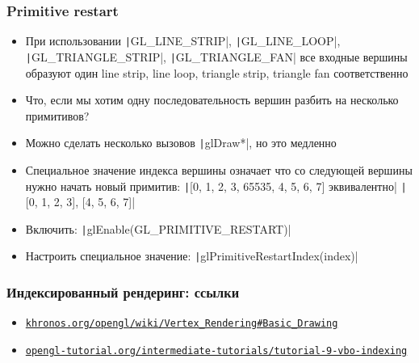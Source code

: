 \documentclass[10pt]{beamer}
\begin{document}
\begin{frame}[fragile]
\frametitle{Primitive restart}
\begin{itemize}
\item При использовании \texttt|GL_LINE_STRIP|, \texttt|GL_LINE_LOOP|, \texttt|GL_TRIANGLE_STRIP|, \texttt|GL_TRIANGLE_FAN| все входные вершины образуют один line strip, line loop, triangle strip, triangle fan соответственно
\pause
\item Что, если мы хотим одну последовательность вершин разбить на несколько примитивов?
\pause
\item Можно сделать несколько вызовов \texttt|glDraw*|, но это медленно
\pause
\item Специальное значение индекса вершины означает что со следующей вершины нужно начать новый примитив:
\texttt|[0, 1, 2, 3, 65535, 4, 5, 6, 7] эквивалентно|
\texttt|[0, 1, 2, 3], [4, 5, 6, 7]|
\pause
\item Включить: \texttt|glEnable(GL_PRIMITIVE_RESTART)|
\pause
\item Настроить специальное значение: \texttt|glPrimitiveRestartIndex(index)|
\end{itemize}
\end{frame}

\begin{frame}[fragile]
\frametitle{Индексированный рендеринг: ссылки}
\begin{itemize}
\item \href{https://www.khronos.org/opengl/wiki/Vertex_Rendering#Basic_Drawing}{\nolinkurl{khronos.org/opengl/wiki/Vertex\_Rendering\#Basic\_Drawing}}
\item \href{http://www.opengl-tutorial.org/intermediate-tutorials/tutorial-9-vbo-indexing}{\nolinkurl{opengl-tutorial.org/intermediate-tutorials/tutorial-9-vbo-indexing}}
\end{itemize}
\end{frame}
\end{document}
